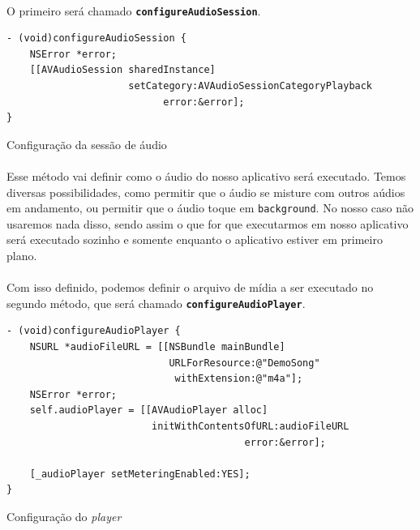 \documentclass[a4paper,12pt,brazil,doubleside]{book}
\begin{document}
\begin{singlespace}
\paragraph{}O primeiro será chamado \texttt{\textbf{configureAudioSession}}.

\begin{listing}[H]
\begin{verbatim}
- (void)configureAudioSession {
    NSError *error;
    [[AVAudioSession sharedInstance]
                     setCategory:AVAudioSessionCategoryPlayback
                           error:&error];
}
\end{verbatim}
\caption{Configuração da sessão de áudio}
\end{listing}

\paragraph{}Esse método vai definir como o áudio do nosso aplicativo será executado. Temos diversas possibilidades, como permitir que o áudio se misture com outros aúdios em andamento, ou permitir que o áudio toque em \texttt{background}. No nosso caso não usaremos nada disso, sendo assim o que for que executarmos em nosso aplicativo será executado sozinho e somente enquanto o aplicativo estiver em primeiro plano.
\paragraph{}Com isso definido, podemos definir o arquivo de mídia a ser executado no segundo método, que será chamado \texttt{\textbf{configureAudioPlayer}}.

\begin{listing}[H]
\begin{verbatim}
- (void)configureAudioPlayer {
    NSURL *audioFileURL = [[NSBundle mainBundle]
                            URLForResource:@"DemoSong"
                             withExtension:@"m4a"];
    NSError *error;
    self.audioPlayer = [[AVAudioPlayer alloc]
                         initWithContentsOfURL:audioFileURL
                                         error:&error];
    
    [_audioPlayer setMeteringEnabled:YES];
}
\end{verbatim}
\caption{Configuração do \emph{player}}
\end{listing}


\end{singlespace}
\end{document}
